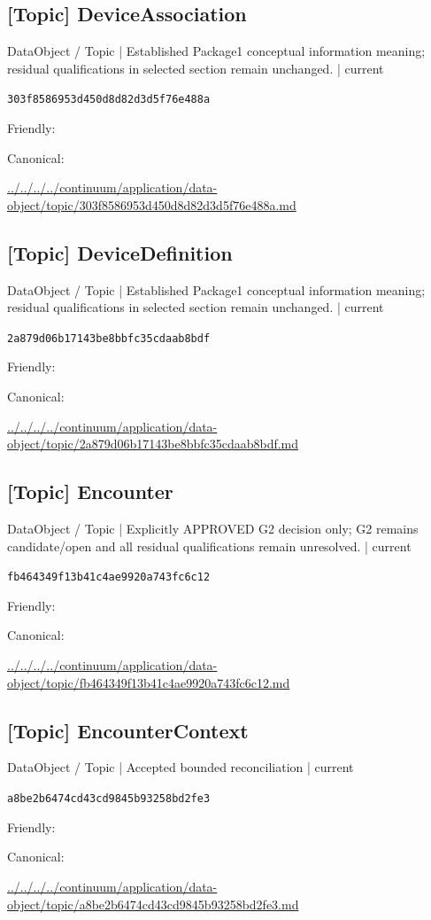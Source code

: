\documentclass[10pt,a4paper]{article}
\begin{document}
\subsection*{[Topic] DeviceAssociation}
{\small DataObject / Topic | Established Package1 conceptual information meaning; residual qualifications in selected section remain unchanged. | current}\par
\texttt{303f8586953d450d8d82d3d5f76e488a}\par
Friendly: \par
Canonical: \par
{\footnotesize\url{../../../../continuum/application/data-object/topic/303f8586953d450d8d82d3d5f76e488a.md}}\par
\subsection*{[Topic] DeviceDefinition}
{\small DataObject / Topic | Established Package1 conceptual information meaning; residual qualifications in selected section remain unchanged. | current}\par
\texttt{2a879d06b17143be8bbfc35cdaab8bdf}\par
Friendly: \par
Canonical: \par
{\footnotesize\url{../../../../continuum/application/data-object/topic/2a879d06b17143be8bbfc35cdaab8bdf.md}}\par
\subsection*{[Topic] Encounter}
{\small DataObject / Topic | Explicitly APPROVED G2 decision only; G2 remains candidate/open and all residual qualifications remain unresolved. | current}\par
\texttt{fb464349f13b41c4ae9920a743fc6c12}\par
Friendly: \par
Canonical: \par
{\footnotesize\url{../../../../continuum/application/data-object/topic/fb464349f13b41c4ae9920a743fc6c12.md}}\par
\subsection*{[Topic] EncounterContext}
{\small DataObject / Topic | Accepted bounded reconciliation | current}\par
\texttt{a8be2b6474cd43cd9845b93258bd2fe3}\par
Friendly: \par
Canonical: \par
{\footnotesize\url{../../../../continuum/application/data-object/topic/a8be2b6474cd43cd9845b93258bd2fe3.md}}\par
\end{document}
